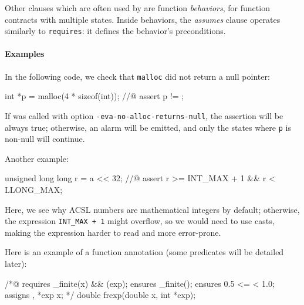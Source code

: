 \documentclass{frama-c-book}
\begin{document}
Other clauses which are often used by \Eva{} are function {\em behaviors}, for
function contracts with multiple states. Inside behaviors, the {\em assumes}
clause operates similarly to \texttt{requires}: it defines the behavior's
preconditions.

\paragraph{Examples}

In the following code, we check that \texttt{malloc} did not return a null
pointer:

\begin{listing-nonumber}
int *p = malloc(4 * sizeof(int));
//@ assert p != \null;
\end{listing-nonumber}

If \Eva{} was called with option \texttt{-eva-no-alloc-returns-null},
the assertion will be always true; otherwise, an alarm will be emitted,
and only the states where \texttt{p} is non-null will continue.

Another example:

\begin{listing-nonumber}
unsigned long long r = a << 32;
//@ assert r >= INT_MAX + 1 && r < LLONG_MAX;
\end{listing-nonumber}

Here, we see why ACSL numbers are mathematical integers by default; otherwise,
the expression \texttt{INT\_MAX + 1} might overflow, so we would need to use
casts, making the expression harder to read and more error-prone.

Here is an example of a function annotation (some predicates will be detailed
later):

\begin{listing-nonumber}
/*@
  requires \is_finite(x) && \valid(exp);
  ensures \is_finite(\result);
  ensures 0.5 <= \result < 1.0;
  assigns \result, *exp \from x;
 */
double frexp(double x, int *exp);
\end{listing-nonumber}
\end{document}
